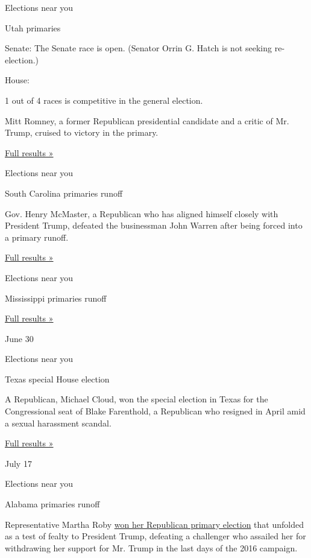 Elections near you

Utah primaries

Senate: The Senate race is open. (Senator Orrin G. Hatch is not seeking
re-election.)

House:

1 out of 4 races is competitive in the general election.

Mitt Romney, a former Republican presidential candidate and a critic of
Mr. Trump, cruised to victory in the primary.

\href{https://www.nytimes3xbfgragh.onion/interactive/2018/06/26/us/elections/results-utah-primary-elections-ul.html}{Full
results »}

Elections near you

South Carolina primaries runoff

Gov. Henry McMaster, a Republican who has aligned himself closely with
President Trump, defeated the businessman John Warren after being forced
into a primary runoff.

\href{https://www.nytimes3xbfgragh.onion/interactive/2018/06/26/us/elections/results-south-carolina-primary-runoff-elections.html}{Full
results »}

Elections near you

Mississippi primaries runoff

\href{https://www.nytimes3xbfgragh.onion/interactive/2018/06/26/us/elections/results-mississippi-primary-runoff-elections.html}{Full
results »}

June 30

Elections near you

Texas special House election

A Republican, Michael Cloud, won the special election in Texas for the
Congressional seat of Blake Farenthold, a Republican who resigned in
April amid a sexual harassment scandal.

\href{https://www.nytimes3xbfgragh.onion/interactive/2018/06/30/us/politics/election-results-texas-house-district-27.html}{Full
results »}

July 17

Elections near you

Alabama primaries runoff

Representative Martha Roby
\href{https://www.nytimes3xbfgragh.onion/2018/07/17/us/politics/martha-roby-alabama-primary.html}{won
her Republican primary election} that unfolded as a test of fealty to
President Trump, defeating a challenger who assailed her for withdrawing
her support for Mr. Trump in the last days of the 2016 campaign.

